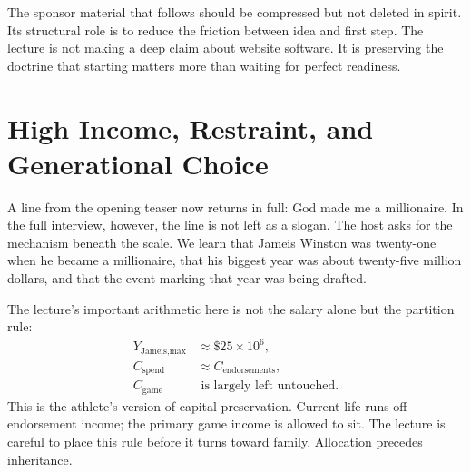 \begin{figure}
\centering
{}
\end{figure}

The sponsor material that follows should be compressed but not deleted in spirit. Its structural role is to reduce the friction between idea and first step. The lecture is not making a deep claim about website software. It is preserving the doctrine that starting matters more than waiting for perfect readiness.

\section{High Income, Restraint, and Generational Choice}

A line from the opening teaser now returns in full: God made me a millionaire. In the full interview, however, the line is not left as a slogan. The host asks for the mechanism beneath the scale. We learn that Jameis Winston was twenty-one when he became a millionaire, that his biggest year was about twenty-five million dollars, and that the event marking that year was being drafted.

The lecture's important arithmetic here is not the salary alone but the partition rule:
\begin{align}
Y_{\text{Jameis,max}}&\approx \$25\times 10^6,\\
C_{\text{spend}}&\approx C_{\text{endorsements}},\\
C_{\text{game}}&\text{ is largely left untouched.}
\end{align}
This is the athlete's version of capital preservation. Current life runs off endorsement income; the primary game income is allowed to sit. The lecture is careful to place this rule before it turns toward family. Allocation precedes inheritance.

